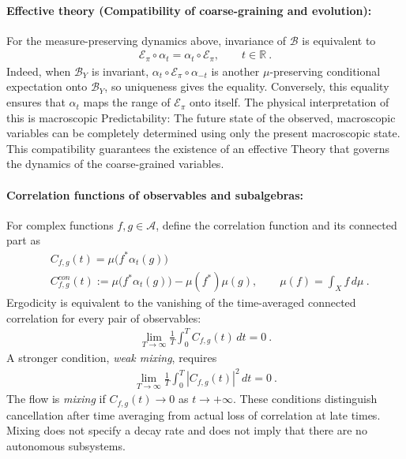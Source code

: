 \documentclass[a4paper,11pt]{article}
\theoremstyle{definition}
\newcommand{\mA}{\mathcal{A}}
\newcommand{\mB}{\mathcal{B}}
\newcommand{\nn}{\nonumber}
\newcommand{\mE}{\mathcal{E}}
\begin{document}

\paragraph{Effective theory (Compatibility of coarse-graining and evolution):}
For the measure-preserving dynamics above, invariance of $\mB$ is equivalent to
\begin{align}\label{eq:classical-expectation-equivariance}
    \mE_{\pi}\circ\alpha_t=\alpha_t\circ \mE_{\pi},
    \qquad t\in\mathbb R\ .
\end{align}
Indeed, when $\mB_Y$ is invariant, $\alpha_t\circ \mE_{\pi}\circ\alpha_{-t}$ is another $\mu$-preserving conditional expectation onto $\mB_Y$, so uniqueness gives the equality. Conversely, this equality ensures that $\alpha_t$ maps the range of $\mE_{\pi}$ onto itself. The physical interpretation of this is macroscopic Predictability: The future state of the observed, macroscopic variables can be completely determined using only the present macroscopic state. This compatibility guarantees the existence of an effective Theory that governs the dynamics of the coarse-grained variables.


\paragraph{Correlation functions of observables and subalgebras:}
For complex functions $f,g\in\mA$, define the correlation function and its connected part as
\begin{align}
    &C_{f,g}(t)=\mu\bigl(f^*\alpha_t(g)\bigr)\nn\\
    &C^{con}_{f,g}(t)
    :=\mu\bigl(f^*\alpha_t(g)\bigr)-\mu(f^*)\mu(g),
    \qquad \mu(f)=\int_X f\,d\mu\ .
\end{align}
Ergodicity is equivalent to the vanishing of the time-averaged connected correlation for every pair of observables:
\begin{align}
    \lim_{T\to\infty}\frac{1}{T}\int_0^T C_{f,g}(t)\,dt=0\ .
\end{align}
A stronger condition, {\it weak mixing}, requires
\begin{align}
    \lim_{T\to\infty}\frac{1}{T}\int_0^T |C_{f,g}(t)|^2\,dt=0\ .
\end{align}
The flow is {\it mixing} if $C_{f,g}(t)\to0$ as $t\to+\infty$. These conditions distinguish cancellation after time averaging from actual loss of correlation at late times. Mixing does not specify a decay rate and does not imply that there are no autonomous subsystems.
\end{document}
